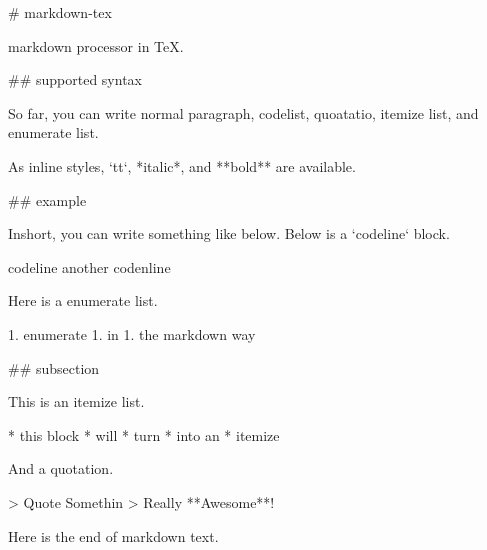 \documentclass[uplatex]{jsarticle}
\begin{document}
\begin{markdown}

# markdown-tex

markdown processor in TeX.

## supported syntax

So far, you can write normal paragraph, codelist, quoatatio, itemize list, and enumerate list. 

As inline styles, `tt`, *italic*, and **bold** are available.

## example

Inshort, you can write something like below.
Below is a `codeline` block.

    codeline
      another codenline

Here is a enumerate list.

1. enumerate
1. in 
1. the markdown way

## subsection

This is an itemize list. 

* this block
* will
* turn 
* into an 
* itemize

And a quotation. 

> Quote Somethin
> Really **Awesome**!

Here is the end of markdown text.


\end{markdown}
\end{document}
